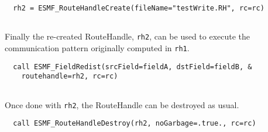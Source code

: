  \begin{verbatim}
  rh2 = ESMF_RouteHandleCreate(fileName="testWrite.RH", rc=rc)
 
\end{verbatim}
 

   Finally the re-created RouteHandle, {\tt rh2}, can be used to execute the
   communication pattern originally computed in {\tt rh1}. 

 \begin{verbatim}
  call ESMF_FieldRedist(srcField=fieldA, dstField=fieldB, &
    routehandle=rh2, rc=rc)
 
\end{verbatim}
 

   Once done with {\tt rh2}, the RouteHandle can be destroyed as usual. 

 \begin{verbatim}
  call ESMF_RouteHandleDestroy(rh2, noGarbage=.true., rc=rc)
 
\end{verbatim}

\setlength{\parskip}{\oldparskip}
\setlength{\parindent}{\oldparindent}
\setlength{\baselineskip}{\oldbaselineskip}
